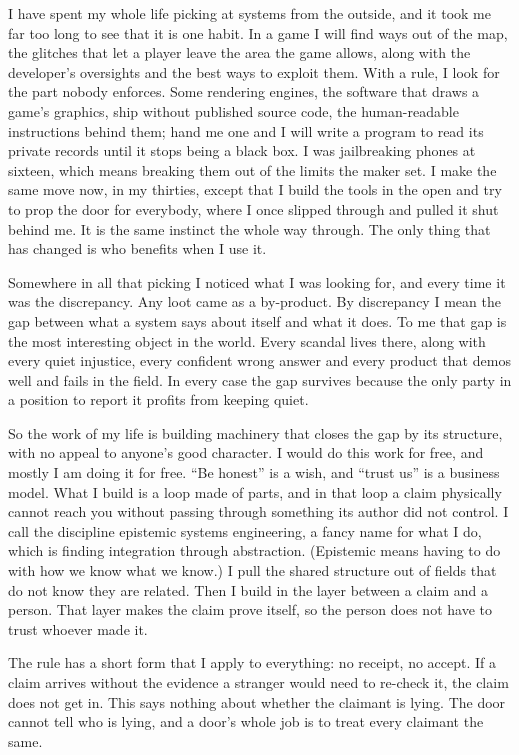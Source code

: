\documentclass[11pt]{article}
\begin{document}
I have spent my whole life picking at systems from the outside, and it took me far too long to see that it is one habit. In a game I will find ways out of the map, the glitches that let a player leave the area the game allows, along with the developer's oversights and the best ways to exploit them. With a rule, I look for the part nobody enforces. Some rendering engines, the software that draws a game's graphics, ship without published source code, the human-readable instructions behind them; hand me one and I will write a program to read its private records until it stops being a black box. I was jailbreaking phones at sixteen, which means breaking them out of the limits the maker set. I make the same move now, in my thirties, except that I build the tools in the open and try to prop the door for everybody, where I once slipped through and pulled it shut behind me. It is the same instinct the whole way through. The only thing that has changed is who benefits when I use it.

Somewhere in all that picking I noticed what I was looking for, and every time it was the discrepancy. Any loot came as a by-product. By discrepancy I mean the gap between what a system says about itself and what it does. To me that gap is the most interesting object in the world. Every scandal lives there, along with every quiet injustice, every confident wrong answer and every product that demos well and fails in the field. In every case the gap survives because the only party in a position to report it profits from keeping quiet.

So the work of my life is building machinery that closes the gap by its structure, with no appeal to anyone's good character. I would do this work for free, and mostly I am doing it for free. ``Be honest'' is a wish, and ``trust us'' is a business model. What I build is a loop made of parts, and in that loop a claim physically cannot reach you without passing through something its author did not control. I call the discipline epistemic systems engineering, a fancy name for what I do, which is finding integration through abstraction. (Epistemic means having to do with how we know what we know.) I pull the shared structure out of fields that do not know they are related. Then I build in the layer between a claim and a person. That layer makes the claim prove itself, so the person does not have to trust whoever made it.

The rule has a short form that I apply to everything: no receipt, no accept. If a claim arrives without the evidence a stranger would need to re-check it, the claim does not get in. This says nothing about whether the claimant is lying. The door cannot tell who is lying, and a door's whole job is to treat every claimant the same.
\end{document}
